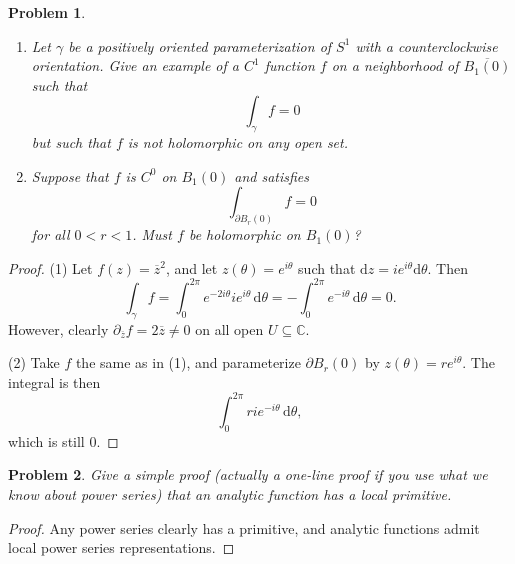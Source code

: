 \documentclass[11pt, letterpaper]{article}
\theoremstyle{plain}
\newtheorem{problem}{Problem}
\begin{document}
\begin{problem}
	\begin{enumerate}
		\item Let $\gamma $ be a positively oriented parameterization of $S^1$ with a counterclockwise orientation. Give an example of a $C^1$ function $f$ on a neighborhood of $\overline{B_1(0)} $ such that
			\[
				\int_\gamma f =0
			\]
			but such that $f$ is not holomorphic on any open set.
		\item Suppose that $f$ is $C^0$ on $B_1(0)$ and satisfies
			\[
				\int_{\partial B_r(0)} f=0
			\]
			for all $0<r<1$. Must $f$ be holomorphic on $B_1(0)$?
	\end{enumerate}
\end{problem}
\begin{proof}
	(1) Let $f(z)=\overline{z} ^2$, and let $z(\theta )=e^{i\theta } $ such that $\mathrm{d} z=ie^{i\theta } \mathrm{d} \theta $. Then
	\[
		\int_\gamma f = \int_0^{2\pi } e^{-2i\theta } ie^{i\theta }  \,\mathrm{d} \theta =-\int_{0}^{2\pi } e^{-i\theta }  \,\mathrm{d} \theta =0
	.\]
	However, clearly $\partial _{\overline{z} } f =2 \overline{z} \neq 0$ on all open $U\subseteq \mathbb{C} $.

	(2) Take $f$ the same as in (1), and parameterize $\partial B_r(0)$ by $z(\theta )=re^{i\theta } $. The integral is then
	\[
		\int_{0}^{2\pi } rie^{-i\theta }  \,\mathrm{d} \theta ,
	\]
	which is still 0.
\end{proof}



\begin{problem}
	Give a simple proof (actually a one-line proof if you use what we know about power series) that an analytic function has a \emph{local} primitive.
\end{problem}
\begin{proof}
	Any power series clearly has a primitive, and analytic functions admit local power series representations.
\end{proof}
\end{document}
